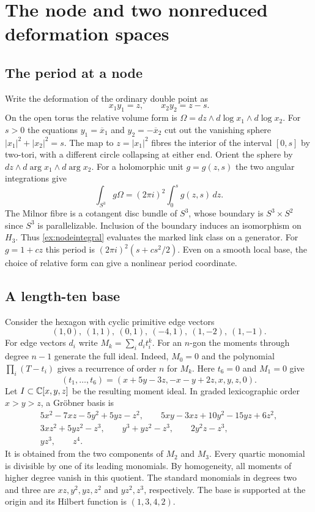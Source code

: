 \section{The node and two nonreduced deformation spaces}\label{sec:examples}

\subsection*{The period at a node}
Write the deformation of the ordinary double point as
\[
 x_1y_1=z,\qquad x_2y_2=z-s.
\]
On the open torus the relative volume form is
$\Omega=dz\wedge d\log x_1\wedge d\log x_2$.
For $s>0$ the equations $y_1=\overline{x}_1$ and
$y_2=-\overline{x}_2$ cut out the vanishing sphere
$|x_1|^2+|x_2|^2=s$. The map to $z=|x_1|^2$ fibres the interior
of the interval $[0,s]$ by two-tori, with a different circle collapsing
at either end. Orient the sphere by $dz\wedge d\arg x_1\wedge d\arg x_2$.
For a holomorphic unit $g=g(z,s)$ the two angular integrations give
\begin{equation}\label{ex:nodeintegral}
 \int_{S^3}g\Omega=(2\pi i)^2\int_0^s g(z,s)\,dz.
\end{equation}
The Milnor fibre is a cotangent disc bundle of $S^3$, whose boundary
is $S^3\times S^2$ since $S^3$ is parallelizable. Inclusion of the
boundary induces an isomorphism on $H_3$. Thus
\eqref{ex:nodeintegral} evaluates the marked link class on a generator.
For $g=1+cz$ this period is $(2\pi i)^2(s+cs^2/2)$. Even on a smooth
local base, the choice of relative form can give a nonlinear period
coordinate.

\subsection*{A length-ten base}
Consider the hexagon with cyclic primitive edge vectors
\[
 (1,0),\ (1,1),\ (0,1),\ (-4,1),\ (1,-2),\ (1,-1).
\]
For edge vectors $d_i$ write $M_k=\sum_i d_i t_i^k$. For an $n$-gon
the moments through degree $n-1$ generate the full ideal. Indeed,
$M_0=0$ and the polynomial $\prod_i(T-t_i)$ gives a recurrence of
order $n$ for $M_k$. Here $t_6=0$ and $M_1=0$ give
\[
 (t_1,\ldots,t_6)=(x+5y-3z,-x-y+2z,x,y,z,0).
\]
Let $I\subset\mathbb C[x,y,z]$ be the resulting moment ideal. In graded
lexicographic order $x>y>z$, a Gr\"obner basis is
\[
\begin{gathered}
 5x^2-7xz-5y^2+5yz-z^2,\qquad
 5xy-3xz+10y^2-15yz+6z^2,\\
 3xz^2+5yz^2-z^3,\qquad y^3+yz^2-z^3,\qquad 2y^2z-z^3,\\
 yz^3,\qquad z^4.
\end{gathered}
\]
It is obtained from the two components of $M_2$ and $M_3$.
Every quartic monomial is divisible by one of its leading monomials.
By homogeneity, all moments of higher degree vanish in this quotient.
The standard monomials in degrees
two and three are $xz,y^2,yz,z^2$ and $yz^2,z^3$, respectively.
The base is supported at the origin and its Hilbert function is $(1,3,4,2)$.

